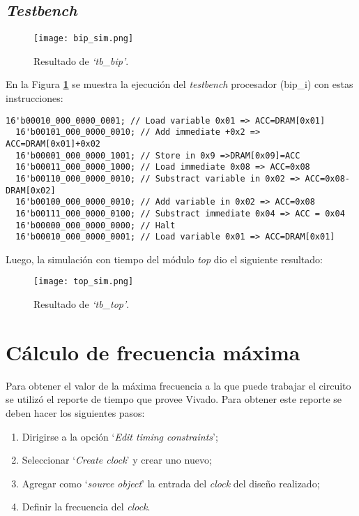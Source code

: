 \documentclass[12pt,a4paper]{article}
\begin{document}
\subsection{\emph{Testbench}}
\label{subs:tb}

\begin{figure}[H]
	\centering
	\texttt{[image: bip\_sim.png]}
	\caption{Resultado de \emph{`tb\_bip'}.}
	\label{fig:bip}
\end{figure}

En la Figura \textbf{\ref{fig:bip}} se muestra la ejecución del \emph{testbench} procesador (bip\_i) con estas instrucciones:

\begin{lstlisting}[language=ve]
  16'b00010_000_0000_0001; // Load variable 0x01 => ACC=DRAM[0x01]
  16'b00101_000_0000_0010; // Add immediate +0x2 => ACC=DRAM[0x01]+0x02
  16'b00001_000_0000_1001; // Store in 0x9 =>DRAM[0x09]=ACC
  16'b00011_000_0000_1000; // Load immediate 0x08 => ACC=0x08
  16'b00110_000_0000_0010; // Substract variable in 0x02 => ACC=0x08-DRAM[0x02]
  16'b00100_000_0000_0010; // Add variable in 0x02 => ACC=0x08
  16'b00111_000_0000_0100; // Substract immediate 0x04 => ACC = 0x04
  16'b00000_000_0000_0000; // Halt
  16'b00010_000_0000_0001; // Load variable 0x01 => ACC=DRAM[0x01]
\end{lstlisting}

Luego, la simulación con tiempo del módulo \emph{top} dio el siguiente resultado:

\begin{figure}[H]
	\centering
	\texttt{[image: top\_sim.png]}
	\caption{Resultado de \emph{`tb\_top'}.}
	\label{fig:top}
\end{figure}


\section{Cálculo de frecuencia máxima}
\label{sec:freq}

Para obtener el valor de la máxima frecuencia a la que puede trabajar el
circuito se utilizó el reporte de tiempo que provee Vivado. Para obtener este reporte se deben hacer los siguientes pasos:

\begin{enumerate}
\item Dirigirse a la opción `\emph{Edit timing constraints}';
\item Seleccionar `\emph{Create clock}' y crear uno nuevo;
\item Agregar como `\emph{source object}' la entrada del \emph{clock} del diseño realizado;
\item Definir la frecuencia del \emph{clock}.
\end{enumerate}
\end{document}
